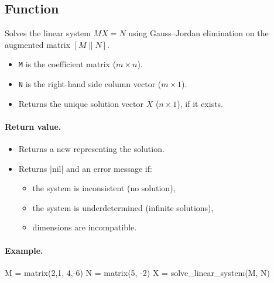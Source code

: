 

\subsection{Function } %
\label{ssub:solve_linear_system}

Solves the linear system $MX = N$ using Gauss–Jordan elimination on the augmented matrix $[M\|N]$.

\begin{itemize}
\item \texttt{M} is the coefficient matrix ($m \times n$).
\item \texttt{N} is the right-hand side column vector ($m \times 1$).
\item Returns the unique solution vector $X$ ($n \times 1$), if it exists.
\end{itemize}

\paragraph{Return value.}
\begin{itemize}
\item Returns a new  representing the solution.
\item Returns |nil| and an error message if:
\begin{itemize}
\item the system is inconsistent (no solution),
\item the system is underdetermined (infinite solutions),
\item dimensions are incompatible.
\end{itemize}
\end{itemize}

\paragraph{Example.}
\begin{tkzexample}
M = matrix({{2,1}, {4,-6}})
N = matrix({{5}, {-2}})
X = solve_linear_system(M, N)
\end{tkzexample}




